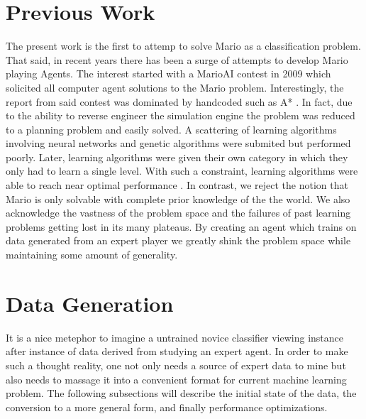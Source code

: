 \documentclass[]{article}   %
\begin{document}
\section{Previous Work}
\label{sec:prevwork}
The present work is the first to attemp to solve Mario as a classification problem.  That said, in recent years there has been a surge of attempts to develop Mario playing Agents.  The interest started with a MarioAI contest in 2009 which solicited all computer agent solutions to the Mario problem.  Interestingly, the report from said contest was dominated by handcoded such as A* \cite{marioaicompetiton}.  In fact, due to the ability to reverse engineer the simulation engine the problem was reduced to a planning problem and easily solved.  A scattering of learning algorithms involving neural networks and genetic algorithms were submited but performed poorly.  Later, learning algorithms were given their own category in which they only had to learn a single level. With such a constraint, learning algorithms were able to reach near optimal performance \cite{speed}. In contrast, we reject the notion that Mario is only solvable with complete prior knowledge of the the world.  We also acknowledge the vastness of the problem space and the failures of past learning problems getting lost in its many plateaus.  By creating an agent which trains on data generated from an expert player we greatly shink the problem space while maintaining some amount of generality.  



\section{Data Generation}     %
\label{sec:datagen}
It is a nice metephor to imagine a untrained novice classifier viewing instance after instance of data derived from studying an expert agent.  In order to make such a thought reality, one not only needs a source of expert data to mine but also needs to massage it into a convenient format for current machine learning problem.  The following subsections will describe the initial state of the data, the conversion to a more general form, and finally performance optimizations.
\end{document}
